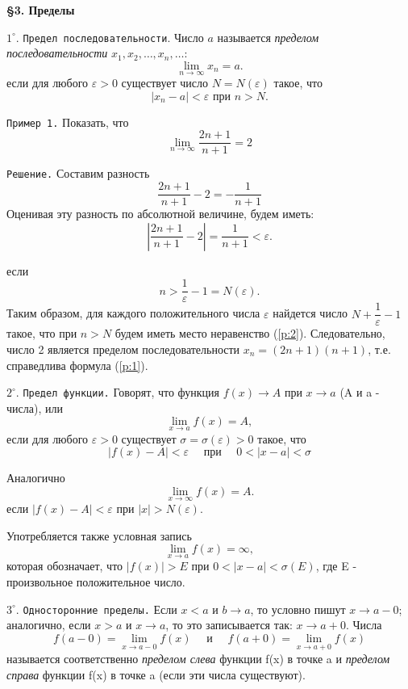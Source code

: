 \documentclass[12pt]{article}
\begin{document}
	
	\begin{center}
		{\bf \S3. Пределы}
	\end{center}
	
	$1^{\circ}$. {\tt Предел последовательности}. Число $a$ называется {\it пределом последовательности} $x_1, x_2, \dots, x_n,\dots$:
	\[
		\lim\limits_{n\to\infty} x_n = a.
	\]
	если для любого $\varepsilon >0$ существует число $N=N(\varepsilon)$ такое, что
	\[
		|x_n-a| < \varepsilon \text{ при } n>N.
	\]
	
	{\tt Пример 1.} Показать, что
	\[
		\lim\limits_{n\to\infty} \dfrac{2n+1}{n+1} = 2 \tag{1}\label{p:1}
	\]
	
	{\tt Решение.} Составим разность
	\[
		\dfrac{2n+1}{n+1} -2 = -\dfrac{1}{n+1}
	\]
	Оценивая эту разность по абсолютной величине, будем иметь:
	\[
		\left|\dfrac{2n+1}{n+1}-2\right| = \dfrac{1}{n+1} <\varepsilon. \tag{2}\label{p:2}
	\]
	
	если 
	\[
		n>\dfrac{1}{\varepsilon} - 1 =N(\varepsilon).
	\]
	Таким образом, для каждого положительного числа $\varepsilon$ найдется число $N+\dfrac{1}{\varepsilon} -1$ такое, что при $n>N$ будем иметь место неравенство (\ref{p:2}). Следовательно, число 2 является пределом последовательности $x_n = (2n+1)(n+1)$, т.е. справедлива формула (\ref{p:1}).
	
	$2^{\circ}$. {\tt Предел функции.} Говорят, что функция $f(x)\longrightarrow A$ при $x\longrightarrow a$ (A и a - числа), или
	\[
		\lim\limits_{x\to a} f(x) = A,
	\]
	если для любого $\varepsilon>0$ существует $\sigma = \sigma(\varepsilon)>0$ такое, что
	\[
		|f(x)-A| <\varepsilon \quad\text{ при }\quad 0<|x-a|<\sigma
	\]
	
	Аналогично
	\[
		\lim\limits_{x\to \infty} f(x) = A.
	\]
	если $|f(x)-A|<\varepsilon$ при $|x|>N(\varepsilon)$.
	
	\qquad Употребляется также условная запись
	\[
		\lim\limits_{x\to a} f(x) = \infty,
	\]
	которая обозначает, что $|f(x)|>E$ при $0<|x-a|<\sigma(E)$, где E - произвольное положительное число.
	
	$3^{\circ}$. {\tt Односторонние пределы.} Если $x<a$ и $b\longrightarrow a$, то условно пишут $x\longrightarrow a-0$; аналогично, если $x>a$ и $x\longrightarrow a$, то это записывается так: $x\longrightarrow a+0$. Числа
	\[
		f(a-0) = \lim\limits_{x\to a-0} f(x) \quad \text{ и }\quad f(a+0) = \lim\limits_{x\to a+0} f(x)
	\]
	называется соответственно {\it пределом слева} функции f(x) в точке a и {\it пределом справа} функции f(x) в точке a (если эти числа существуют).
	
\end{document}
